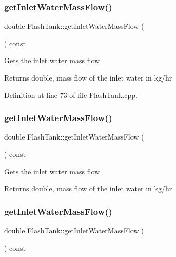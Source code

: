 \subsubsection{\texorpdfstring{get\+Inlet\+Water\+Mass\+Flow()}{getInletWaterMassFlow()}\hspace{0.1cm}{\footnotesize\ttfamily [1/3]}}
{\footnotesize\ttfamily double Flash\+Tank\+::get\+Inlet\+Water\+Mass\+Flow (\begin{DoxyParamCaption}{ }\end{DoxyParamCaption}) const}

Gets the inlet water mass flow \begin{DoxyReturn}{Returns}
double, mass flow of the inlet water in kg/hr 
\end{DoxyReturn}


Definition at line 73 of file Flash\+Tank.\+cpp.

\mbox{\label{class_flash_tank_a2b6dcd9e175a9f2fc550ea91006aa66a}} 
\subsubsection{\texorpdfstring{get\+Inlet\+Water\+Mass\+Flow()}{getInletWaterMassFlow()}\hspace{0.1cm}{\footnotesize\ttfamily [2/3]}}
{\footnotesize\ttfamily double Flash\+Tank\+::get\+Inlet\+Water\+Mass\+Flow (\begin{DoxyParamCaption}{ }\end{DoxyParamCaption}) const}

Gets the inlet water mass flow \begin{DoxyReturn}{Returns}
double, mass flow of the inlet water in kg/hr 
\end{DoxyReturn}
\mbox{\label{class_flash_tank_a2b6dcd9e175a9f2fc550ea91006aa66a}} 
\subsubsection{\texorpdfstring{get\+Inlet\+Water\+Mass\+Flow()}{getInletWaterMassFlow()}\hspace{0.1cm}{\footnotesize\ttfamily [3/3]}}
{\footnotesize\ttfamily double Flash\+Tank\+::get\+Inlet\+Water\+Mass\+Flow (\begin{DoxyParamCaption}{ }\end{DoxyParamCaption}) const}

